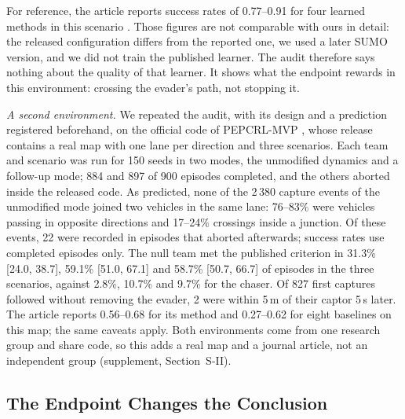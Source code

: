 \documentclass[5p,twocolumn]{elsarticle}
\begin{document}
For reference, the article reports success rates of 0.77--0.91 for four learned methods in this scenario
\cite{li2023dgmarl}. Those figures are not comparable with ours in detail: the released configuration differs from the
reported one, we used a later SUMO version, and we did not train the published learner. The audit therefore says
nothing about the quality of that learner. It shows what the endpoint rewards in this environment: crossing the
evader's path, not stopping it.

\emph{A second environment.} We repeated the audit, with its design and a prediction registered beforehand, on the
official code of PEPCRL-MVP \cite{li2024pepcrl}, whose release contains a real map with one lane per direction and
three scenarios. Each team and scenario was run for 150 seeds in two modes, the unmodified dynamics and a follow-up
mode; 884 and 897 of 900 episodes completed, and the others aborted inside the released code. As predicted, none of
the 2\,380 capture events of the unmodified mode joined two vehicles in the same lane: 76--83\% were vehicles passing
in opposite directions and 17--24\% crossings inside a junction. Of these events, 22 were recorded in episodes that
aborted afterwards; success rates use completed episodes only. The null team met the published criterion in 31.3\%
[24.0, 38.7], 59.1\% [51.0, 67.1] and 58.7\% [50.7, 66.7] of episodes in the three scenarios, against 2.8\%, 10.7\%
and 9.7\% for the chaser. Of 827 first captures followed without removing the evader, 2 were within 5\,m of their
captor 5\,s later. The article reports 0.56--0.68 for its method and 0.27--0.62 for eight baselines on this map; the
same caveats apply. Both environments come from one research group and share code, so this adds a real map and a
journal article, not an independent group (supplement, Section~S-II).

\subsection{The Endpoint Changes the Conclusion}
\label{sec:reversal}
\end{document}
